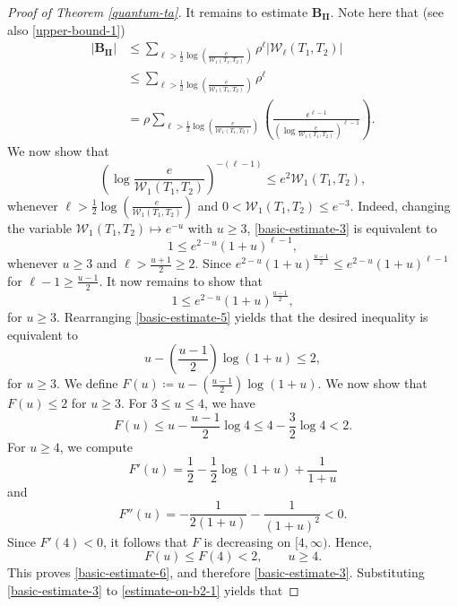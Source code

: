\documentclass{amsbook}
\theoremstyle{definition}
\theoremstyle{remark}
\numberwithin{section}{chapter}
\numberwithin{equation}{chapter}
\newcommand{\1}{\mathbf{1}}
\begin{document}
\begin{proof}[Proof of Theorem \ref{quantum-ta}]
It remains to estimate $\mathbf{B_{II}}$. Note here that (see also \eqref{upper-bound-1}) 
	\begin{equation}\label{estimate-on-b2-1}
		\begin{split}
			|\mathbf{B_{II}}|&\leq \sum_{\ell>\frac 12\log\left(\frac{e}{\mathcal{W}_1(T_1,T_2)}\right)}\rho^{\ell}|\mathcal{W}_{\ell}(T_1,T_2)|\\
			&\leq \sum_{\ell>\frac 12\log\left(\frac{e}{\mathcal{W}_1(T_1,T_2)}\right)}\rho^{\ell}\\
			&=\rho\sum_{\ell>\frac 12\log\left(\frac{e}{\mathcal{W}_1(T_1,T_2)}\right)} \left(\frac{\epsilon^{\ell-1}}{\left(\log\frac{e}{\mathcal{W}_1(T_1,T_2)}\right)^{\ell-1}}\right).
		\end{split}
	\end{equation}
We now show that
	\begin{equation}\label{basic-estimate-3}
		\left(\log\frac{e}{\mathcal{W}_1(T_1,T_2)}\right)^{-(\ell-1)}\leq e^2\mathcal{W}_1(T_1,T_2),
	\end{equation}
	whenever $\ell>\frac 12\log\left(\frac{e}{\mathcal{W}_1(T_1,T_2)}\right)$ and $0<\mathcal{W}_1(T_1,T_2)\leq e^{-3}$. Indeed, changing the variable $\mathcal{W}_1(T_1,T_2)\mapsto e^{-u}$ with $u\geq 3$, \eqref{basic-estimate-3} is equivalent to
$$		1\leq e^{2-u}(1+u)^{\ell-1},$$
whenever $u\geq 3$ and $\ell> \frac{u+1}{2}\geq 2$. Since $e^{2-u}(1+u)^{\frac{u-1}{2}}\leq e^{2-u}(1+u)^{\ell-1}$ for $\ell-1\geq \frac{u-1}{2}$. It now remains to show that
	\begin{equation}\label{basic-estimate-5}
		1\leq e^{2-u}(1+u)^{\frac{u-1}{2}},
	\end{equation}
	for $u\geq 3$. Rearranging \eqref{basic-estimate-5} yields that the desired inequality is equivalent to
	\begin{equation}\label{basic-estimate-6}
		u-\left(\frac{u-1}{2}\right)\log(1+u)\leq 2,
	\end{equation}
	for $u\geq 3$. We define $F(u)\coloneqq u-\left(\frac{u-1}{2}\right)\log(1+u)$. We now show that $F(u)\leq 2$ for $u\geq 3$.
For $3\leq u\leq 4$, we have
\[
F(u)\leq
u-\frac{u-1}{2}\log 4\leq
4-\frac{3}{2}\log 4
<2.
\]
For $u\geq 4$, we compute
\[
F'(u)
=
\frac{1}{2}
-\frac{1}{2}\log(1+u)
+\frac{1}{1+u}
\]
and
\[
F''(u)
=
-\frac{1}{2(1+u)}
-\frac{1}{(1+u)^2}
<0.
\]
Since $F'(4)<0$, it follows that $F$ is decreasing on
$[4,\infty)$. Hence,
\[
F(u)\leq F(4)<2,
\qquad u\geq 4.
\]
This proves \eqref{basic-estimate-6}, and therefore
\eqref{basic-estimate-3}.
 Substituting \eqref{basic-estimate-3} to \eqref{estimate-on-b2-1} yields that

\end{proof}
\end{document}
